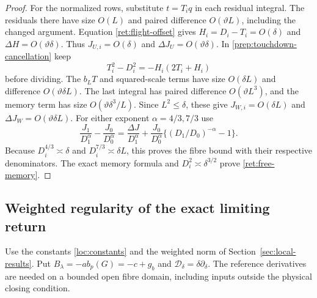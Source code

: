 \begin{proof}
For the normalized rows, substitute $t=T_iq$ in each residual integral.
The residuals there have size $O(L)$ and paired difference
$O(\vartheta L)$, including the changed argument. Equation
\eqref{ret:flight-offset} gives $H_i=D_i-T_i=O(\delta)$ and
$\Delta H=O(\vartheta\delta)$. Thus
$J_{U,i}=O(\delta)$ and $\Delta J_U=O(\vartheta\delta)$.
In \eqref{prep:touchdown-cancellation} keep
\[
 T_i^2-D_i^2=-H_i(2T_i+H_i)
\]
before dividing. The $b_LT$ and squared-scale terms have size
$O(\delta L)$ and difference $O(\vartheta\delta L)$.
The last integral has paired difference $O(\vartheta L^3)$,
and the memory term has size $O(\vartheta\delta^3/L)$.
Since $L^2\le\delta$, these give
$J_{W,i}=O(\delta L)$ and $\Delta J_W=O(\vartheta\delta L)$.
For either exponent $\alpha=4/3,7/3$ use
\begin{equation}
 \frac{J_1}{D_1^\alpha}-\frac{J_0}{D_0^\alpha}
 =\frac{\Delta J}{D_1^\alpha}
  +\frac{J_0}{D_0^\alpha}
       \{(D_1/D_0)^{-\alpha}-1\}.
 \label{ret:two-denominators}
\end{equation}
Because $D_i^{4/3}\asymp\delta$ and
$D_i^{7/3}\asymp\delta L$, this proves the fibre bound with their
respective denominators. The exact memory formula and
$D_i^2\asymp\delta^{3/2}$ prove \eqref{ret:free-memory}.
\end{proof}

\subsection{Weighted regularity of the exact limiting return}

Use the constants \eqref{loc:constants} and the weighted norm of
Section~\ref{sec:local-results}. Put
$B_\lambda=-ab_p(G)=-c+g_b$ and
$\mathscr D_\delta=\delta\partial_\delta$.
The reference derivatives are needed on a bounded open fibre domain,
including inputs outside the physical closing condition.

